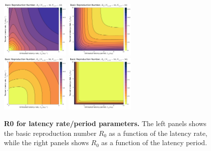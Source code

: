 \documentclass[12pt]{article}
\begin{document}
\begin{figure}[H]
    \includegraphics[width=0.3\textwidth]{../../fig/gen_model/R0_rates_SMxST_10x10.pdf}
    \includegraphics[width=0.3\textwidth]{../../fig/gen_model/R0_periods_SMxST_10x10.pdf}\\
    \includegraphics[width=0.3\textwidth]{../../fig/gen_model/R0_rates_SMxST_50x50.pdf}
    \includegraphics[width=0.3\textwidth]{../../fig/gen_model/R0_periods_SMxST_50x50.pdf}\\
    \caption{\textbf{R0 for latency rate/period parameters.} The left panels shows the basic reproduction number \(R_0\) as a function of the latency rate, while the right panels shows \(R_0\) as a function of the latency period.}
\end{figure}
\end{document}
